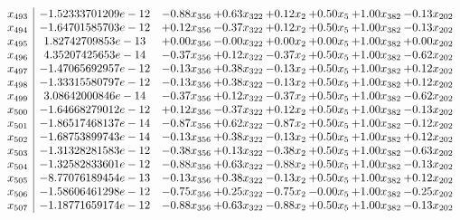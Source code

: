 \documentclass[8pt]{article}
\begin{document}
\[\begin{array}{c| c c@{\hskip 2pt} c@{\hskip 2pt} c@{\hskip 2pt} c@{\hskip 2pt} c@{\hskip 2pt} c@{\hskip 2pt} }
 x_{493}   &  -1.52333701209e-12 & -0.88 x_{356} & +  0.63 x_{322} & +  0.12 x_{2} & +  0.50 x_{5} & +  1.00 x_{382} & -0.13 x_{202}\\
 x_{494}   &  -1.64701585703e-12 & +  0.12 x_{356} & -0.37 x_{322} & +  0.12 x_{2} & +  0.50 x_{5} & +  1.00 x_{382} & -0.13 x_{202}\\
 x_{495}   &  1.82742709853e-13 & +  0.00 x_{356} & -0.00 x_{322} & +  0.00 x_{2} & +  0.00 x_{5} & +  1.00 x_{382} & +  0.00 x_{202}\\
 x_{496}   &  4.35207425653e-14 & -0.37 x_{356} & +  0.12 x_{322} & -0.37 x_{2} & +  0.50 x_{5} & +  1.00 x_{382} & -0.62 x_{202}\\
 x_{497}   &  -1.47065692957e-12 & -0.13 x_{356} & +  0.38 x_{322} & -0.13 x_{2} & +  0.50 x_{5} & +  1.00 x_{382} & +  0.12 x_{202}\\
 x_{498}   &  -1.33315580797e-12 & -0.13 x_{356} & +  0.38 x_{322} & -0.13 x_{2} & +  0.50 x_{5} & +  1.00 x_{382} & +  0.12 x_{202}\\
 x_{499}   &  3.08642000846e-14 & -0.37 x_{356} & +  0.12 x_{322} & -0.37 x_{2} & +  0.50 x_{5} & +  1.00 x_{382} & -0.62 x_{202}\\
 x_{500}   &  -1.64668279012e-12 & +  0.12 x_{356} & -0.37 x_{322} & +  0.12 x_{2} & +  0.50 x_{5} & +  1.00 x_{382} & -0.13 x_{202}\\
 x_{501}   &  -1.86517468137e-14 & -0.87 x_{356} & +  0.62 x_{322} & -0.87 x_{2} & +  0.50 x_{5} & +  1.00 x_{382} & -0.12 x_{202}\\
 x_{502}   &  -1.68753899743e-14 & -0.13 x_{356} & +  0.38 x_{322} & -0.13 x_{2} & +  0.50 x_{5} & +  1.00 x_{382} & +  0.12 x_{202}\\
 x_{503}   &  -1.31328281583e-12 & -0.38 x_{356} & +  0.13 x_{322} & -0.38 x_{2} & +  0.50 x_{5} & +  1.00 x_{382} & -0.63 x_{202}\\
 x_{504}   &  -1.32582833601e-12 & -0.88 x_{356} & +  0.63 x_{322} & -0.88 x_{2} & +  0.50 x_{5} & +  1.00 x_{382} & -0.13 x_{202}\\
 x_{505}   &  -8.77076189454e-13 & -0.13 x_{356} & +  0.38 x_{322} & -0.13 x_{2} & +  0.50 x_{5} & +  1.00 x_{382} & +  0.12 x_{202}\\
 x_{506}   &  -1.58606461298e-12 & -0.75 x_{356} & +  0.25 x_{322} & -0.75 x_{2} & -0.00 x_{5} & +  1.00 x_{382} & -0.25 x_{202}\\
 x_{507}   &  -1.18771659174e-12 & -0.88 x_{356} & +  0.63 x_{322} & -0.88 x_{2} & +  0.50 x_{5} & +  1.00 x_{382} & -0.13 x_{202}\\

\end{array}\]
\end{document}
